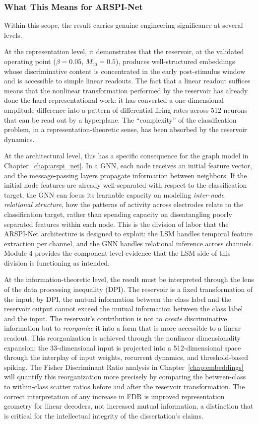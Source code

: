 \subsubsection{What This Means for ARSPI-Net}

Within this scope, the result carries genuine engineering significance at several levels.

At the representation level, it demonstrates that the reservoir, at the validated operating point ($\beta = 0.05$, $M_{\text{th}} = 0.5$), produces well-structured embeddings whose discriminative content is concentrated in the early post-stimulus window and is accessible to simple linear readouts. The fact that a linear readout suffices means that the nonlinear transformation performed by the reservoir has already done the hard representational work: it has converted a one-dimensional amplitude difference into a pattern of differential firing rates across 512 neurons that can be read out by a hyperplane. The ``complexity'' of the classification problem, in a representation-theoretic sense, has been absorbed by the reservoir dynamics.

At the architectural level, this has a specific consequence for the graph model in Chapter~\ref{chap:arspi_net}. In a GNN, each node receives an initial feature vector, and the message-passing layers propagate information between neighbors. If the initial node features are already well-separated with respect to the classification target, the GNN can focus its learnable capacity on modeling \emph{inter-node relational structure}, how the patterns of activity across electrodes relate to the classification target, rather than spending capacity on disentangling poorly separated features within each node. This is the division of labor that the ARSPI-Net architecture is designed to exploit: the LSM handles temporal feature extraction per channel, and the GNN handles relational inference across channels. Module 4 provides the component-level evidence that the LSM side of this division is functioning as intended.

At the information-theoretic level, the result must be interpreted through the lens of the data processing inequality (DPI). The reservoir is a fixed transformation of the input; by DPI, the mutual information between the class label and the reservoir output cannot exceed the mutual information between the class label and the input. The reservoir's contribution is not to \emph{create} discriminative information but to \emph{reorganize} it into a form that is more accessible to a linear readout. This reorganization is achieved through the nonlinear dimensionality expansion: the 33-dimensional input is projected into a 512-dimensional space through the interplay of input weights, recurrent dynamics, and threshold-based spiking. The Fisher Discriminant Ratio analysis in Chapter~\ref{chap:embeddings} will quantify this reorganization more precisely by comparing the between-class to within-class scatter ratios before and after the reservoir transformation. The correct interpretation of any increase in FDR is improved representation geometry for linear decoders, not increased mutual information, a distinction that is critical for the intellectual integrity of the dissertation's claims.


